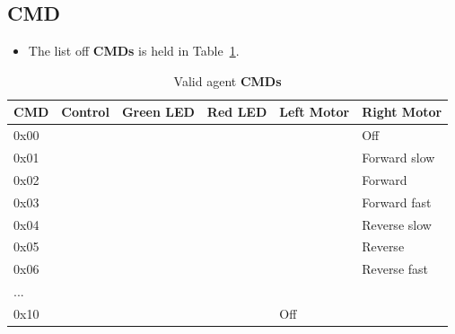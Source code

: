 \documentclass[a4paper]{article}
\begin{document}
   \subsection{CMD}
      \begin{itemize}
         \item The list off \textbf{CMDs} is held in Table~\ref{tab_cmds}. 
      \end{itemize}
 
      \begin{table}[h]
         \centering
         \caption{Valid agent \textbf{CMDs}}
         \label{tab_cmds}
         \begin{tabular}{|l|l|l|l|l|l|}
               \hline
               \textbf{CMD}   &  \textbf{Control}     &  \textbf{Green LED}   &  \textbf{Red LED}  &  \textbf{Left Motor}  &  \textbf{Right Motor} \\ \hline  
               0x00           &                       &                       &                    &                       &  Off                  \\ \hline   
               0x01           &                       &                       &                    &                       &  Forward slow         \\ \hline   
               0x02           &                       &                       &                    &                       &  Forward              \\ \hline   
               0x03           &                       &                       &                    &                       &  Forward fast         \\ \hline   
               0x04           &                       &                       &                    &                       &  Reverse slow         \\ \hline   
               0x05           &                       &                       &                    &                       &  Reverse              \\ \hline   
               0x06           &                       &                       &                    &                       &  Reverse fast         \\ \hline   
               ...            &                       &                       &                    &                       &                       \\ \hline   
               0x10           &                       &                       &                    &  Off                  &                       \\ \hline   

\end{tabular}
\end{table}
\end{document}
